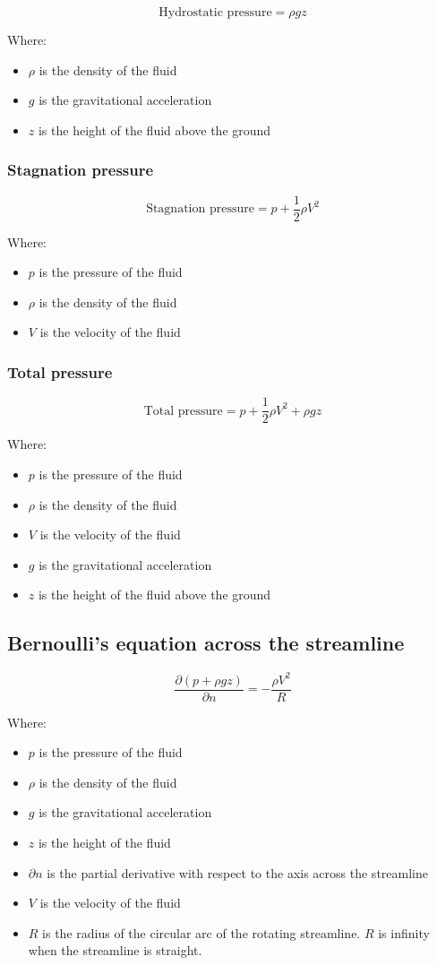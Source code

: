 \documentclass[11pt]{article}
\begin{document}
\[\text{Hydrostatic pressure} = \rho g z\]

Where:
\begin{itemize}
\item \(\rho\) is the density of the fluid
\item \(g\) is the gravitational acceleration
\item \(z\) is the height of the fluid above the ground
\end{itemize}
\subsubsection{Stagnation pressure}
\label{sec:org9f9dc17}
\[\text{Stagnation pressure} = p + \frac{1}{2} \rho V^2\]

Where:
\begin{itemize}
\item \(p\) is the pressure of the fluid
\item \(\rho\) is the density of the fluid
\item \(V\) is the velocity of the fluid
\end{itemize}

\newpage
\subsubsection{Total pressure}
\label{sec:orga0166cc}
\[\text{Total pressure} = p + \frac{1}{2} \rho V^2 + \rho g z\]

Where:
\begin{itemize}
\item \(p\) is the pressure of the fluid
\item \(\rho\) is the density of the fluid
\item \(V\) is the velocity of the fluid
\item \(g\) is the gravitational acceleration
\item \(z\) is the height of the fluid above the ground
\end{itemize}
\subsection{Bernoulli's equation across the streamline}
\label{sec:org1343b04}
\[\frac{\partial \left(p + \rho g z \right)}{\partial n} = - \frac{\rho V^2}{R}\]

Where:
\begin{itemize}
\item \(p\) is the pressure of the fluid
\item \(\rho\) is the density of the fluid
\item \(g\) is the gravitational acceleration
\item \(z\) is the height of the fluid
\item \(\partial n\) is the partial derivative with respect to the axis across the streamline
\item \(V\) is the velocity of the fluid
\item \(R\) is the radius of the circular arc of the rotating streamline. \(R\) is infinity when the streamline is straight.
\end{itemize}
\end{document}
